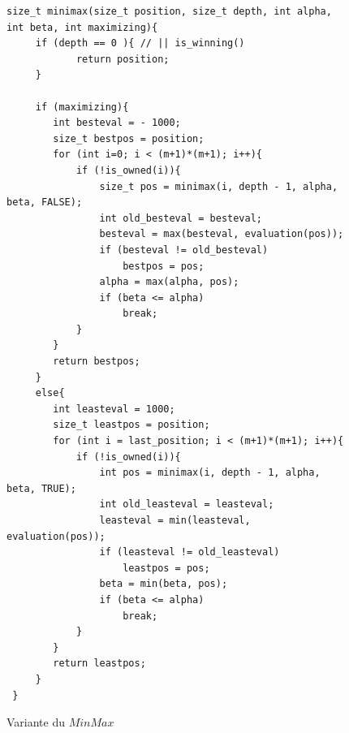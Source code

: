 \documentclass{article}
\begin{document}
\begin{figure}[ht]
\begin{lstlisting}
size_t minimax(size_t position, size_t depth, int alpha, int beta, int maximizing){
     if (depth == 0 ){ // || is_winning()
            return position;
     }

     if (maximizing){
        int besteval = - 1000;
        size_t bestpos = position;
        for (int i=0; i < (m+1)*(m+1); i++){
            if (!is_owned(i)){
                size_t pos = minimax(i, depth - 1, alpha, beta, FALSE);
                int old_besteval = besteval;
                besteval = max(besteval, evaluation(pos));
                if (besteval != old_besteval)
                    bestpos = pos;
                alpha = max(alpha, pos);
                if (beta <= alpha)
                    break;   
            }
        }
        return bestpos;
     }
     else{
        int leasteval = 1000;
        size_t leastpos = position;
        for (int i = last_position; i < (m+1)*(m+1); i++){
            if (!is_owned(i)){
                int pos = minimax(i, depth - 1, alpha, beta, TRUE);
                int old_leasteval = leasteval;
                leasteval = min(leasteval, evaluation(pos)); 
                if (leasteval != old_leasteval)
                    leastpos = pos; 
                beta = min(beta, pos);
                if (beta <= alpha)
                    break;  
            }
        }
        return leastpos;
     }
 }
\end{lstlisting}
    \caption{Variante du $MinMax$}
    \label{fig:Minmax}
\end{figure}
\end{document}
